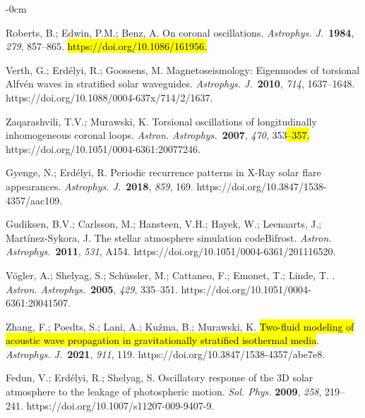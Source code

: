 \documentclass[physics,article,accept,pdftex,moreauthors]{Definitions/mdpi}
\newcommand{\aap}{{\it Astron. Astrophys.}}
\newcommand{\apj}{{\it Astrophys. J.}}
\begin{document}
\begin{adjustwidth}{-\extralength}{0cm}
\begin{thebibliography}{999}
		 Roberts, B.; Edwin, P.M.; Benz, A. On coronal oscillations. \apj~\textbf{1984}, \emph{279}, 857--865. 
\hl{https://doi.org/10.1086/161956.}

		 Verth, G.; Erd\'elyi, R.; Goossens, M. Magnetoseismology: Eigenmodes of torsional Alfv\'en 
waves in stratified solar waveguides. \apj~\textbf{2010}, \emph{714}, 1637--1648. https://doi.org/10.1088/0004-637x/714/2/1637.

  Zaqarashvili, T.V.; Murawski, K. {Torsional oscillations of 
longitudinally inhomogeneous coronal loops}. \aap~\textbf{2007}, \emph{470}, 353\hl{--357.} https://doi.org/10.1051/0004-6361:20077246.
		
		 Gyenge, N.; Erd\'elyi, R. Periodic recurrence patterns in X-Ray solar flare 
appearances. \apj~\textbf{2018}, \emph{859}, 169. https://doi.org/10.3847/1538-4357/aac109.
		
				Gudiksen, B.V.; Carlsson, M.; Hansteen, V.H.; Hayek, W.; Leenaarts, J.; Martínez-Sykora, J. The stellar atmosphere simulation codeBifrost. \aap~\textbf{2011}, \emph{531}, A154. https://doi.org/10.1051/0004-6361/201116520.
		
		{V{\"o}gler}, A.; {Shelyag}, S.; {Sch{\"u}ssler}, M.; {Cattaneo}, F.; {Emonet}, T.; {Linde}, T.
		. \aap~\textbf{2005}, \emph{429}, 335--351. https://doi.org/10.1051/0004-6361:20041507.
		
		Zhang, F.; Poedts, S.; Lani, A.; Ku{\'z}ma, B.; Murawski, K. 
\hl{Two-fluid modeling of acoustic wave propagation in gravitationally stratified isothermal media}.  \apj~\textbf{2021}, \emph{911}, 119. 
https://doi.org/10.3847/1538-4357/abe7e8.
		
		Fedun, V.; Erd\'elyi, R.; Shelyag, S. Oscillatory response of the 3D solar atmosphere to the leakage of photospheric motion. 
\emph{Sol. Phys.} \textbf{2009}, \emph{258}, 219--241. https://doi.org/10.1007/s11207-009-9407-9.
		

\end{thebibliography}
\end{adjustwidth}
\end{document}
